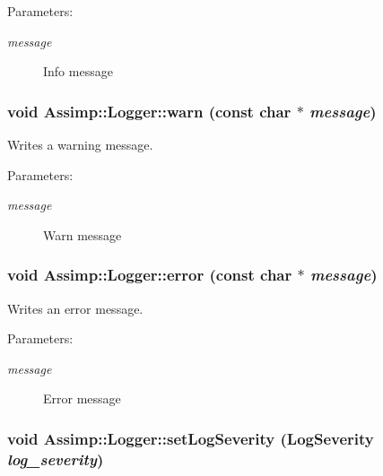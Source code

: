 \begin{Desc}
\item[Parameters:]
\begin{description}
\item[{\em message}]Info message \end{description}
\end{Desc}
\hypertarget{class_assimp_1_1_logger_32bc5ee4b23df13551b83b925907f1b1}{
\subsubsection[warn]{\setlength{\rightskip}{0pt plus 5cm}void Assimp::Logger::warn (const char $\ast$ {\em message})}}
\label{class_assimp_1_1_logger_32bc5ee4b23df13551b83b925907f1b1}


Writes a warning message. 

\begin{Desc}
\item[Parameters:]
\begin{description}
\item[{\em message}]Warn message \end{description}
\end{Desc}
\hypertarget{class_assimp_1_1_logger_a8b7c3f56dc4cecfdacc8bb36ba3fac1}{
\subsubsection[error]{\setlength{\rightskip}{0pt plus 5cm}void Assimp::Logger::error (const char $\ast$ {\em message})}}
\label{class_assimp_1_1_logger_a8b7c3f56dc4cecfdacc8bb36ba3fac1}


Writes an error message. 

\begin{Desc}
\item[Parameters:]
\begin{description}
\item[{\em message}]Error message \end{description}
\end{Desc}
\hypertarget{class_assimp_1_1_logger_8fb4fa4c2c329a36ac39bc9c743925f1}{
\subsubsection[setLogSeverity]{\setlength{\rightskip}{0pt plus 5cm}void Assimp::Logger::setLogSeverity ({\bf LogSeverity} {\em log\_\-severity})}}
\label{class_assimp_1_1_logger_8fb4fa4c2c329a36ac39bc9c743925f1}


